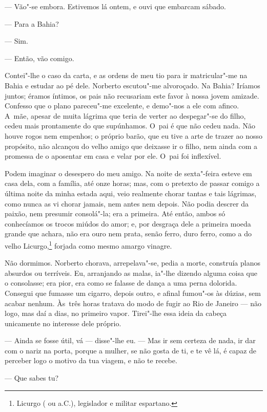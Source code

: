 \begin{linenumbers}
--- Vão"-se embora. Estivemos lá ontem, e ouvi que embarcam sábado.

--- Para a Bahia?

--- Sim.

--- Então, vão comigo.

Contei"-lhe o caso da carta, e as ordens de meu tio para ir matricular"-me
na Bahia e estudar ao pé dele. Norberto escutou"-me alvoroçado. Na Bahia?
Iríamos juntos; éramos íntimos, os pais não recusariam este favor à
nossa jovem amizade. Confesso que o plano pareceu"-me excelente, e
demo"-nos a ele com afinco. A~mãe, apesar de muita lágrima que teria de
verter ao despegar"-se do filho, cedeu mais prontamente do que
supúnhamos. O~pai é que não cedeu nada. Não houve rogos nem empenhos; o
próprio barão, que eu tive a arte de trazer ao nosso propósito, não
alcançou do velho amigo que deixasse ir o filho, nem ainda com a
promessa de o aposentar em casa e velar por ele. O~pai foi inflexível.

Podem imaginar o desespero do meu amigo. Na noite de sexta"-feira esteve
em casa dela, com a família, até onze horas; mas, com o pretexto de
passar comigo a última noite da minha estada aqui, veio realmente chorar
tantas e tais lágrimas, como nunca as vi chorar jamais, nem antes nem
depois. Não podia descrer da paixão, nem presumir consolá"-la; era a
primeira. Até então, ambos só conhecíamos os trocos miúdos do amor; e,
por desgraça dele a primeira moeda grande que achara, não era ouro nem
prata, senão ferro, duro ferro, como a do velho Licurgo,\footnote{Licurgo
  ( ou  a.C.), legislador e militar espartano.} forjada como
mesmo amargo vinagre.

Não dormimos. Norberto chorava, arrepelava"-se, pedia a morte, construía
planos absurdos ou terríveis. Eu, arranjando as malas, ia"-lhe dizendo
alguma coisa que o consolasse; era pior, era como se falasse de dança a
uma perna dolorida. Consegui que fumasse um cigarro, depois outro, e
afinal fumou"-os às dúzias, sem acabar nenhum. Às~três horas tratava do
modo de fugir ao Rio de Janeiro --- não logo, mas daí a dias, no primeiro
vapor. Tirei"-lhe essa ideia da cabeça unicamente no interesse dele
próprio.

--- Ainda se fosse útil, vá --- disse"-lhe eu. --- Mas ir sem certeza de
nada, ir dar com o nariz na porta, porque a mulher, se não gosta de ti,
e te vê lá, é capaz de perceber logo o motivo da tua viagem, e não te
recebe.

--- Que sabes tu?


\end{linenumbers}
